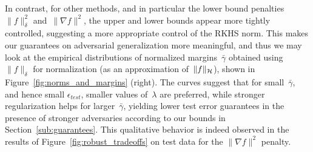 In contrast, for other methods, and in particular the lower bound penalties~$\|f\|_\delta^2$ and~$\|\nabla f\|^2$,
the upper and lower bounds appear more tightly controlled, suggesting a more appropriate control
of the RKHS norm.
This makes our guarantees on adversarial generalization more meaningful,
and thus we may look at the empirical
distributions of normalized margins~$\bar{\gamma}$ obtained using $\|f\|_\delta$ for normalization (as an approximation of~$\|f\|_{\mathcal H}$),
shown in Figure~\ref{fig:norms_and_margins} (right).
The curves suggest that for small~$\bar{\gamma}$, and hence small $\epsilon_{test}$,
smaller values of~$\lambda$ are preferred, while stronger regularization helps
for larger~$\bar \gamma$, yielding lower test error guarantees in the presence of stronger adversaries
according to our bounds in
Section~\ref{sub:guarantees}.
This qualitative behavior is indeed observed in the results of Figure~\ref{fig:robust_tradeoffs} on test data
for the $\|\nabla f\|^2$ penalty.


